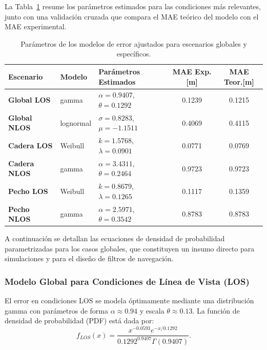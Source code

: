 La Tabla~\ref{tab:modelos_parametricos} resume los parámetros estimados para las condiciones más relevantes, junto con una validación cruzada que compara el MAE teórico del modelo con el MAE experimental.
%
\begin{table}[t]
\centering
\scriptsize
\caption{Parámetros de los modelos de error ajustados para escenarios globales y específicos.}
\label{tab:modelos_parametricos}
\begin{tabular}{lllcc}
\toprule
\rowcolor{headerblue}
\textbf{Escenario} & \textbf{Modelo} & \textbf{Parámetros Estimados} & \textbf{MAE Exp.[m]} & \textbf{MAE Teor.[m]} \\
\midrule
\textbf{Global LOS} & gamma & $\alpha=0.9407$, $\theta=0.1292$ & 0.1239 & 0.1215 \\
\addlinespace
\textbf{Global NLOS} & lognormal & $\sigma=0.8283$, $\mu=-1.1511$ & 0.4069 & 0.4115 \\
\addlinespace
\textbf{Cadera LOS} & Weibull & $k=1.5768$, $\lambda=0.0901$ & 0.0771 & 0.0769 \\
\addlinespace
\textbf{Cadera NLOS} & gamma & $\alpha=3.4311$, $\theta=0.2464$ & 0.9723 & 0.9723 \\
\addlinespace
\textbf{Pecho LOS} & Weibull & $k=0.8679$, $\lambda=0.1265$ & 0.1117 & 0.1359 \\
\addlinespace
\textbf{Pecho NLOS} & gamma & $\alpha=2.5971$, $\theta=0.3542$ & 0.8783 & 0.8783 \\
\bottomrule
\end{tabular}
\end{table}

A continuación se detallan las ecuaciones de densidad de probabilidad parametrizadas para los casos globales, que constituyen un insumo directo para simulaciones y para el diseño de filtros de navegación.

\subsubsection{Modelo Global para Condiciones de Línea de Vista (LOS)}

El error en condiciones LOS se modela óptimamente mediante una distribución gamma con parámetros de forma $\alpha \approx 0.94$ y escala $\theta \approx 0.13$. La función de densidad de probabilidad (PDF) está dada por:
%
\begin{equation}
f_{LOS}(x) = \frac{x^{-0.0593} e^{-x/0.1292}}{0.1292^{0.9407} \Gamma(0.9407)}.
\end{equation}

